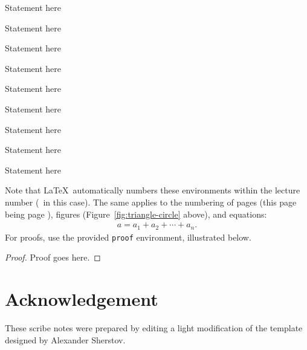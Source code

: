 \documentclass[usletter]{article}
\begin{document}
\begin{fact}
Statement here
\end{fact}

\begin{claim}
Statement here
\end{claim}

\begin{definition}
Statement here
\end{definition}

\begin{example}
Statement here
\end{example}

\begin{assumption}
Statement here
\end{assumption}

\begin{remark}
Statement here
\end{remark}

\begin{conjecture}
Statement here
\end{conjecture}

\begin{openproblem}
Statement here
\end{openproblem}

\begin{problem}
Statement here
\end{problem}


\noindent
Note that \LaTeX\ automatically numbers these
environments within the lecture number (\thelecture\ in
this case).  The same applies to the numbering of pages
(this page being page \thepage), figures
(Figure~\ref{fig:triangle-circle} above), and
equations:
\begin{align}
a = a_1+a_2+\cdots+a_n.
\end{align}
\noindent
For proofs, use the provided {\tt proof} environment,
illustrated below.

\begin{proof}
Proof goes here.
\end{proof}

\section*{Acknowledgement}
These scribe notes were prepared by editing a light modification of the template designed by Alexander Sherstov.



\end{document}
